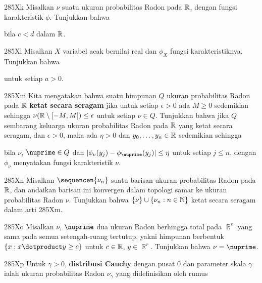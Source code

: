 {\spheader 285Xk Misalkan $\nu$ suatu ukuran probabilitas Radon pada
$\Bbb R$, dengan fungsi karakteristik $\phi$. Tunjukkan bahwa


\noindent bila $c<d$ dalam $\Bbb R$.

\spheader 285Xl Misalkan $X$ variabel acak bernilai real dan
$\phi_X$ fungsi karakteristiknya. Tunjukkan bahwa


\noindent untuk setiap $a>0$.

\spheader 285Xm Kita mengatakan bahwa suatu himpunan $Q$ ukuran probabilitas
Radon pada $\Bbb R$ {\bf ketat secara seragam} jika untuk setiap $\epsilon>0$
ada $M\ge 0$ sedemikian sehingga
$\nu(\Bbb R\setminus[-M,M])\le\epsilon$ untuk setiap $\nu\in Q$. Tunjukkan
bahwa jika $Q$ sembarang keluarga ukuran probabilitas Radon pada $\Bbb R$ yang
ketat secara seragam, dan $\epsilon>0$, maka ada $\eta>0$ dan
$y_0,\ldots,y_n\in\Bbb R$ sedemikian sehingga


\noindent bila $\nu$, $\nuprime\in Q$ dan
$|\phi_{\nu}(y_j)-\phi_{\nuprime}(y_j)|\le\eta$ untuk setiap $j\le n$, dengan
$\phi_{\nu}$ menyatakan fungsi karakteristik $\nu$.

\spheader 285Xn Misalkan $\sequencen{\nu_n}$ suatu barisan ukuran probabilitas
Radon pada $\Bbb R$, dan andaikan barisan ini konvergen dalam topologi samar ke
ukuran probabilitas Radon $\nu$. Tunjukkan bahwa
$\{\nu\}\cup\{\nu_n:n\in\Bbb N\}$ ketat secara seragam dalam arti
285Xm.

\sqheader 285Xo Misalkan $\nu$, $\nuprime$ dua ukuran Radon berhingga total
pada $\BbbR^r$ yang sama pada semua setengah-ruang tertutup, yakni himpunan
berbentuk $\{x:x\dotproduct y\ge c\}$ untuk $c\in\Bbb R$, $y\in\BbbR^r$.
Tunjukkan bahwa $\nu=\nuprime$. 

\sqheader 285Xp
Untuk $\gamma>0$, {\bf distribusi Cauchy} dengan pusat $0$ dan parameter skala
$\gamma$ ialah ukuran probabilitas Radon $\nu_{\gamma}$ yang didefinisikan oleh
rumus

}

